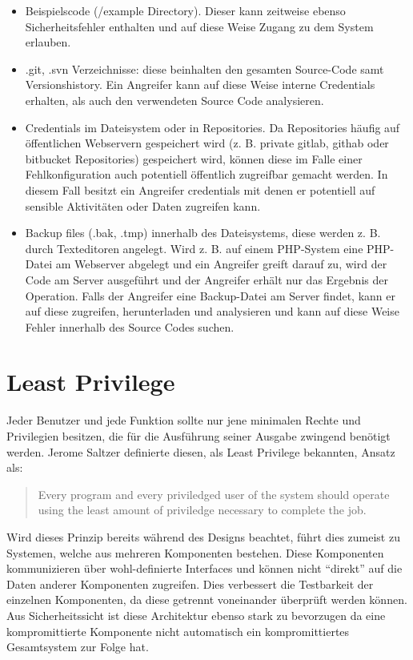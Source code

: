 \begin{itemize}
	\item Beispielscode (/example Directory). Dieser kann zeitweise ebenso Sicherheitsfehler enthalten und auf diese Weise Zugang zu dem System erlauben.
	\item .git, .svn Verzeichnisse: diese beinhalten den gesamten Source-Code samt Versionshistory. Ein Angreifer kann auf diese Weise interne Credentials erhalten, als auch den verwendeten Source Code analysieren.
	\item Credentials im Dateisystem oder in Repositories. Da Repositories häufig auf öffentlichen Webservern gespeichert wird (z. B. private gitlab, githab oder bitbucket Repositories) gespeichert wird, können diese im Falle einer Fehlkonfiguration auch potentiell öffentlich zugreifbar gemacht werden. In diesem Fall besitzt ein Angreifer credentials mit denen er potentiell auf sensible Aktivitäten oder Daten zugreifen kann.
	\item Backup files (.bak, .tmp) innerhalb des Dateisystems, diese werden z. B. durch Texteditoren angelegt. Wird z. B. auf einem PHP-System eine PHP-Datei am Webserver abgelegt und ein Angreifer greift darauf zu, wird der Code am Server ausgeführt und der Angreifer erhält nur das Ergebnis der Operation. Falls der Angreifer eine Backup-Datei am Server findet, kann er auf diese zugreifen, herunterladen und analysieren und kann auf diese Weise Fehler innerhalb des Source Codes suchen.
\end{itemize}

\section{Least Privilege}

Jeder Benutzer und jede Funktion sollte nur jene minimalen Rechte und Privilegien besitzen, die für die Ausführung seiner Ausgabe zwingend benötigt werden. Jerome Saltzer definierte diesen, als Least Privilege bekannten, Ansatz als:

\begin{quote}
Every program and every priviledged user of the system should operate using the least amount of priviledge necessary to complete the job.
\end{quote}

Wird dieses Prinzip bereits während des Designs beachtet, führt dies zumeist zu Systemen, welche aus mehreren Komponenten bestehen. Diese Komponenten kommunizieren über wohl-definierte Interfaces und können nicht ``direkt'' auf die Daten anderer Komponenten zugreifen. Dies verbessert die Testbarkeit der einzelnen Komponenten, da diese getrennt voneinander überprüft werden können. Aus Sicherheitssicht ist diese Architektur ebenso stark zu bevorzugen da eine kompromittierte Komponente nicht automatisch ein kompromittiertes Gesamtsystem zur Folge hat.

